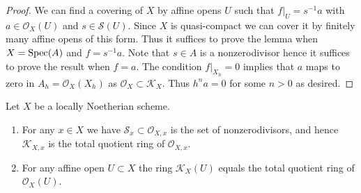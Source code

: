 \begin{proof}
We can find a covering of $X$ by affine opens $U$ such that $f|_U = s^{-1}a$
with $a \in \mathcal{O}_X(U)$ and $s \in \mathcal{S}(U)$. Since $X$ is
quasi-compact we can cover it by finitely many affine opens of this form.
Thus it suffices to prove the lemma when $X = \mathop{\mathrm{Spec}}(A)$ and $f = s^{-1}a$.
Note that $s \in A$ is a nonzerodivisor hence it suffices to prove
the result when $f = a$. The condition $f|_{X_h} = 0$ implies that
$a$ maps to zero in $A_h = \mathcal{O}_X(X_h)$ as
$\mathcal{O}_X \subset \mathcal{K}_X$. Thus $h^na = 0$ for some $n > 0$
as desired.
\end{proof}

\begin{lemma}
\label{lemma-locally-Noetherian-K}
Let $X$ be a locally Noetherian scheme.
\begin{enumerate}
\item For any $x \in X$ we have $\mathcal{S}_x \subset \mathcal{O}_{X, x}$
is the set of nonzerodivisors, and hence $\mathcal{K}_{X, x}$
is the total quotient ring of $\mathcal{O}_{X, x}$.
\item For any affine open $U \subset X$ the ring
$\mathcal{K}_X(U)$ equals the total quotient ring of $\mathcal{O}_X(U)$.
\end{enumerate}
\end{lemma}

